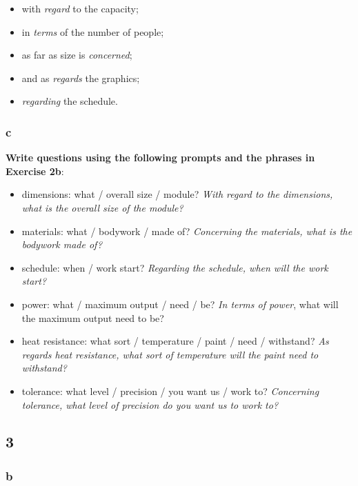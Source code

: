 \begin{itemize}

\item with \textit{regard} to the capacity;
\item in \textit{terms} of the number of people;
\item as far as size is \textit{concerned};
\item and as \textit{regards} the graphics;
\item \textit{regarding} the schedule.

\end{itemize}

\subsubsection{c}

\textbf{Write questions using the following prompts and the phrases in Exercise 2b}:

\begin{itemize}

\item dimensions: what / overall size / module? \textit{With regard to the dimensions, what is the overall size of the module?}
\item materials: what / bodywork / made of? \textit{Concerning the materials, what is the bodywork made of?}
\item schedule: when / work start? \textit{Regarding the schedule, when will the work start?}
\item power: what / maximum output / need / be? \textit{In terms of power}, what will the maximum output need to be?
\item heat resistance: what sort / temperature / paint / need / withstand? \textit{As regards heat resistance, what sort of temperature will the paint need to withstand?}
\item tolerance: what level / precision / you want us / work to? \textit{Concerning tolerance, what level of precision do you want us to work to?}

\end{itemize}

\subsection{3}

\subsubsection{b}

